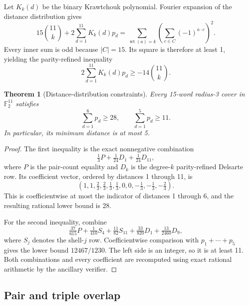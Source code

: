 \documentclass[11pt]{article}
\newtheorem{theorem}{Theorem}
\theoremstyle{definition}
\theoremstyle{remark}
\newcommand{\F}{\mathbb F}
\begin{document}
Let $K_k(d)$ be the binary Krawtchouk polynomial.  Fourier expansion of
the distance distribution gives
\[
  15\binom{11}{k}
  +2\sum_{d=1}^{11}K_k(d)p_d
  =
  \sum_{\operatorname{wt}(a)=k}
  \left(\sum_{c\in C}(-1)^{a\cdot c}\right)^2.
\]
Every inner sum is odd because $|C|=15$.  Its square is therefore at
least 1, yielding the parity-refined inequality
\[
  2\sum_{d=1}^{11}K_k(d)p_d
  \geq-14\binom{11}{k}.
\]

\begin{theorem}[Distance-distribution constraints]
\label{thm:distance}
Every 15-word radius-3 cover in $\F_2^{11}$ satisfies
\[
  \sum_{d=1}^{6}p_d\geq28,
  \qquad
  \sum_{d=1}^{5}p_d\geq11.
\]
In particular, its minimum distance is at most 5.
\end{theorem}

\begin{proof}
The first inequality is the exact nonnegative combination
\[
  \tfrac13 P+\tfrac1{24}D_1+\tfrac1{24}D_{11},
\]
where $P$ is the pair-count equality and $D_k$ is the degree-$k$
parity-refined Delsarte row.  Its coefficient vector, ordered by
distances 1 through 11, is
\[
  (1,1,\tfrac23,\tfrac23,\tfrac13,\tfrac13,
    0,0,-\tfrac13,-\tfrac13,-\tfrac23).
\]
This is coefficientwise at most the indicator of distances 1 through 6,
and the resulting rational lower bound is 28.

For the second inequality, combine
\[
  \tfrac{37}{615}P+\tfrac1{410}S_4
  +\tfrac{11}{82}S_{11}
  +\tfrac{33}{820}D_1+\tfrac{13}{2460}D_9,
\]
where $S_j$ denotes the shell-$j$ row.  Coefficientwise comparison with
$p_1+\cdots+p_5$ gives the lower bound $12467/1230$.  The left side is
an integer, so it is at least 11.  Both combinations and every
coefficient are recomputed using exact rational arithmetic by the
ancillary verifier.
\end{proof}

\subsection{Pair and triple overlap}
\end{document}
